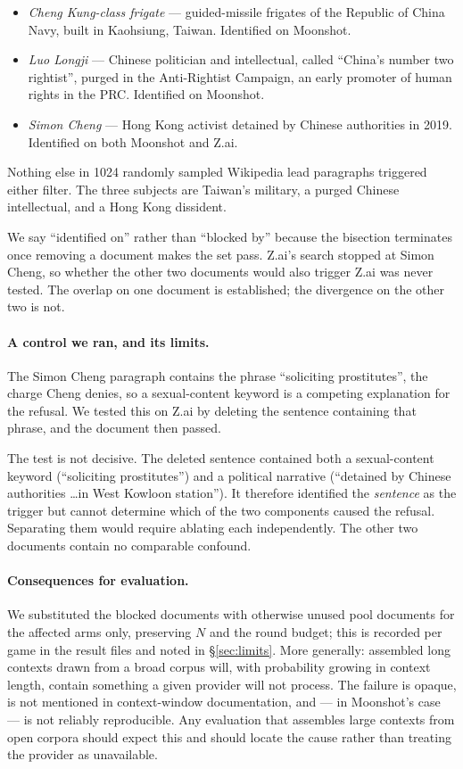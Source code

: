 \documentclass[11pt]{article}
\begin{document}
\begin{itemize}
\item \emph{Cheng Kung-class frigate} --- guided-missile frigates of the
Republic of China Navy, built in Kaohsiung, Taiwan. Identified on Moonshot.
\item \emph{Luo Longji} --- Chinese politician and intellectual, called
``China's number two rightist'', purged in the Anti-Rightist Campaign, an early
promoter of human rights in the PRC. Identified on Moonshot.
\item \emph{Simon Cheng} --- Hong Kong activist detained by Chinese authorities
in 2019. Identified on both Moonshot and Z.ai.
\end{itemize}

Nothing else in 1024 randomly sampled Wikipedia lead paragraphs triggered
either filter. The three subjects are Taiwan's military, a purged Chinese
intellectual, and a Hong Kong dissident.

We say ``identified on'' rather than ``blocked by'' because the bisection
terminates once removing a document makes the set pass. Z.ai's search stopped
at Simon Cheng, so whether the other two documents would also trigger Z.ai was
never tested. The overlap on one document is established; the divergence on the
other two is not.

\paragraph{A control we ran, and its limits.} The Simon Cheng paragraph
contains the phrase ``soliciting prostitutes'', the charge Cheng denies, so a
sexual-content keyword is a competing explanation for the refusal. We tested
this on Z.ai by deleting the sentence containing that phrase, and the document
then passed.

The test is not decisive. The deleted sentence contained both a sexual-content
keyword (``soliciting prostitutes'') and a political narrative (``detained by
Chinese authorities \dots in West Kowloon station''). It therefore identified
the \emph{sentence} as the trigger but cannot determine which of the two
components caused the refusal. Separating them would require ablating each
independently. The other two documents contain no comparable confound.

\paragraph{Consequences for evaluation.} We substituted the blocked documents
with otherwise unused pool documents for the affected arms only, preserving $N$
and the round budget; this is recorded per game in the result files and noted in
\S\ref{sec:limits}. More generally: assembled long contexts drawn from a broad
corpus will, with probability growing in context length, contain something a
given provider will not process. The failure is opaque, is not mentioned in
context-window documentation, and --- in Moonshot's case --- is not reliably
reproducible. Any evaluation that assembles large contexts from open corpora
should expect this and should locate the cause rather than treating the
provider as unavailable.
\end{document}
